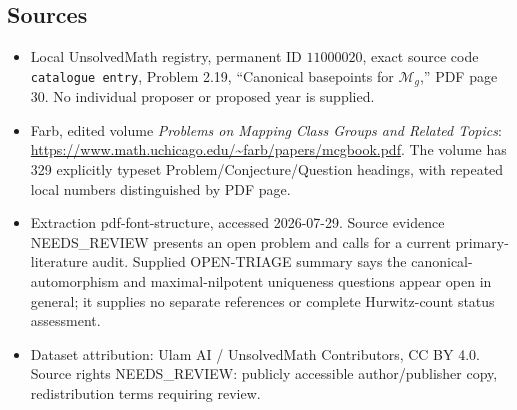 \documentclass[11pt]{article}
\begin{document}
\subsection{Sources}
\begin{itemize}
\item Local UnsolvedMath registry, permanent ID \(11000020\), exact source code \texttt{catalogue entry}, Problem 2.19, ``Canonical basepoints for \(\mathcal M_g\),'' PDF page 30. No individual proposer or proposed year is supplied.
\item Farb, edited volume \emph{Problems on Mapping Class Groups and Related Topics}: \url{https://www.math.uchicago.edu/~farb/papers/mcgbook.pdf}. The volume has 329 explicitly typeset Problem/Conjecture/Question headings, with repeated local numbers distinguished by PDF page.
\item Extraction pdf-font-structure, accessed 2026-07-29. Source evidence NEEDS\_REVIEW presents an open problem and calls for a current primary-literature audit. Supplied OPEN-TRIAGE summary says the canonical-automorphism and maximal-nilpotent uniqueness questions appear open in general; it supplies no separate references or complete Hurwitz-count status assessment.
\item Dataset attribution: Ulam AI / UnsolvedMath Contributors, CC BY 4.0. Source rights NEEDS\_REVIEW: publicly accessible author/publisher copy, redistribution terms requiring review.
\end{itemize}
\end{document}
